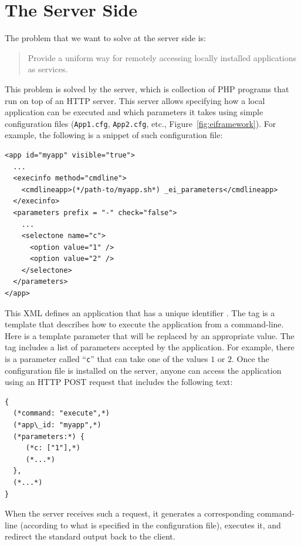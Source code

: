 \section{The Server Side}
\label{ch:overview:arch:server}

The problem that we want to solve at the server side is: 
%
\begin{quote}
  Provide a uniform way for remotely accessing locally installed
  applications as services.
\end{quote}
%
This problem is solved by the \ei server, which is collection of PHP
programs that run on top of an HTTP server. This server allows
specifying how a local application can be executed and which
parameters it takes using simple configuration files
(\texttt{App1.cfg}, \texttt{App2.cfg}, etc.,
Figure~\ref{fig:eiframework}). For example, the following is a snippet
of such configuration file:

\medskip
\begin{lstlisting}
<app id="myapp" visible="true">
  ...
  <execinfo method="cmdline">
    <cmdlineapp>(*/path-to/myapp.sh*) _ei_parameters</cmdlineapp>
  </execinfo>
  <parameters prefix = "-" check="false">
    ...
    <selectone name="c">
      <option value="1" />
      <option value="2" />
    </selectone>
  </parameters>
</app>
\end{lstlisting}

\medskip
\noindent
This XML defines an application that has a unique identifier
.  The  tag is a template that describes
how to execute the application from a command-line. Here
 is a template parameter that will be replaced by
an appropriate value. The  tag includes a list of
parameters accepted by the application. For example, there is a
parameter called ``\texttt{c}'' that can take one of the values $1$ or
$2$.
%
Once the configuration file is installed on the \ei server, anyone can
access the application using an HTTP POST request that includes the
following text:

\medskip
\begin{lstlisting}
{
  (*command: "execute",*)
  (*app\_id: "myapp",*)
  (*parameters:*) {
     (*c: ["1"],*)
     (*...*)
  },
  (*...*)
}
\end{lstlisting} 

\medskip
\noindent
When the \ei server receives such a request, it generates a
corresponding command-line (according to what is specified in the
configuration file), executes it, and redirect the standard output
back to the client.
%

